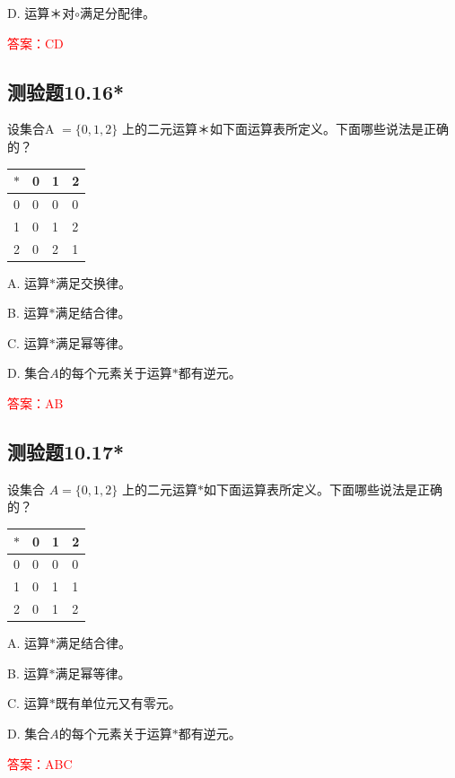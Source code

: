 \documentclass[UTF8, heading=true]{ctexart}
\begin{document}
D. 运算＊对$\circ$满足分配律。

\textcolor{red}{答案：CD}

\subsection{测验题10.16*}

设集合A $=\{0,1,2\}$ 上的二元运算＊如下面运算表所定义。下面哪些说法是正确的？

\begin{table}[H]
  \renewcommand{\arraystretch}{1.5}
  \centering
\begin{tabular}{l|lll}
\hline$*$ & 0 & 1 & 2 \\
\hline 0 & 0 & 0 & 0 \\
1 & 0 & 1 & 2 \\
2 & 0 & 2 & 1 \\
\hline
\end{tabular}
\end{table}

A. 运算$*$满足交换律。

B. 运算$*$满足结合律。

C. 运算$*$满足幂等律。

D. 集合$A$的每个元素关于运算$*$都有逆元。

\textcolor{red}{答案：AB}

\subsection{测验题10.17*}

设集合 $A=\{0,1,2\}$ 上的二元运算$*$如下面运算表所定义。下面哪些说法是正确的？

\begin{table}[H]
  \renewcommand{\arraystretch}{1.5}
  \centering
\begin{tabular}{l|lll}
\hline$*$ & 0 & 1 & 2 \\
\hline 0 & 0 & 0 & 0 \\
1 & 0 & 1 & 1 \\
2 & 0 & 1 & 2 \\
\hline
\end{tabular}
\end{table}

A. 运算$*$满足结合律。

B. 运算$*$满足幂等律。

C. 运算$*$既有单位元又有零元。

D. 集合$A$的每个元素关于运算$*$都有逆元。

\textcolor{red}{答案：ABC}
\end{document}

